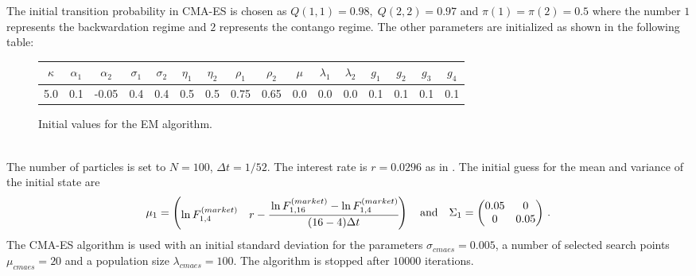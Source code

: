 The initial transition probability in CMA-ES is chosen as $Q(1,1) = 0.98, \; Q(2,2) = 0.97$ and $\pi(1) = \pi(2) = 0.5$ where the number $1$ represents the backwardation regime and $2$ represents the contango regime. The other parameters are initialized as shown in the following table:
\begin{figure}[h!]
	\centering
	\begin{tabular}{||c|c|c|c|c|c|c|c|c|c|c|c|c|c|c|c||}
		$\kappa$ & $\alpha_1$ & $\alpha_2$ & $\sigma_1$ & $\sigma_2$ & $\eta_1$ & $\eta_2$ & $\rho_1$ & $\rho_2$ & $\mu$ & $\lambda_1$ & $\lambda_2$ & $g_1$ & $g_2$ & $g_3$ & $g_4$ \\
		\hline
		5.0 & 0.1 & -0.05 & 0.4 & 0.4 & 0.5 & 0.5 & 0.75 & 0.65 & 0.0 & 0.0 & 0.0 & 0.1 & 0.1 & 0.1 & 0.1
	\end{tabular}
	\caption{Initial values for the EM algorithm.}
\end{figure}\\
The number of particles is set to $N = 100$, $\Delta t = 1/52$. %
The interest rate is $r = 0.0296$ as in \cite{almansour:2016}. The initial guess for the mean and variance of the initial state are
\[
\mu_1 = \begin{pmatrix} \ln F^{(market)}_{1,4} & r-\cfrac{\ln F^{(market)}_{1,16}-\ln F^{(market)}_{1,4}}{(16-4)\Delta t} \end{pmatrix}\quad \mbox{and}\quad \Sigma_1 = \begin{pmatrix} 0.05 & 0 \\ 0 & 0.05 \end{pmatrix}\,.
\]
The CMA-ES algorithm is used with an initial standard deviation for the parameters $\sigma_{cmaes} = 0.005$, a number of selected search points $\mu_{cmaes} = 20$ and a population size $\lambda_{cmaes} = 100$. The algorithm is stopped after $10000$ iterations.
